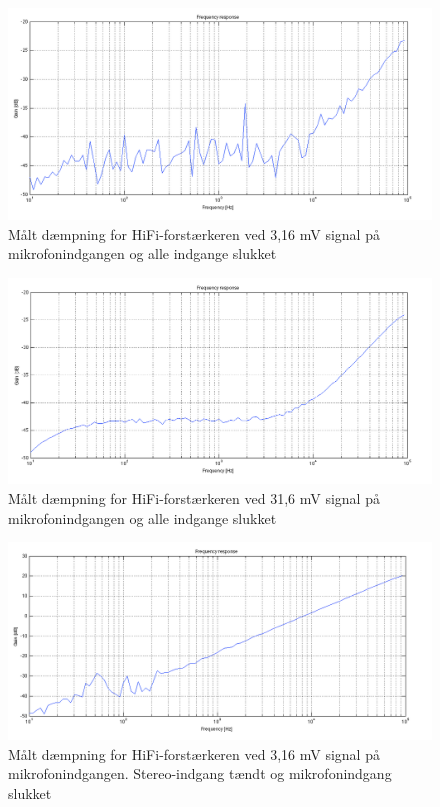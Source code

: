 \begin{figure}[h]
\centering
\includegraphics[width=\textwidth]{maalerapporter/final/daempning/final_daempning_mic_3,16mv_alloff.png}
\caption{Målt dæmpning for HiFi-forstærkeren ved 3,16 mV signal på mikrofonindgangen og alle indgange slukket}
\label{maalerapport_final9}
\end{figure}

\begin{figure}[h]
\centering
\includegraphics[width=\textwidth]{maalerapporter/final/daempning/final_daempning_mic_31,6mv_alloff.png}
\caption{Målt dæmpning for HiFi-forstærkeren ved 31,6 mV signal på mikrofonindgangen og alle indgange slukket}
\label{maalerapport_final10}
\end{figure}

\begin{figure}[h]
\centering
\includegraphics[width=\textwidth]{maalerapporter/final/daempning/final_daempning_mic_3,16mv_stereoon.png}
\caption{Målt dæmpning for HiFi-forstærkeren ved 3,16 mV signal på mikrofonindgangen. Stereo-indgang tændt og mikrofonindgang slukket}
\label{maalerapport_final11}
\end{figure}

